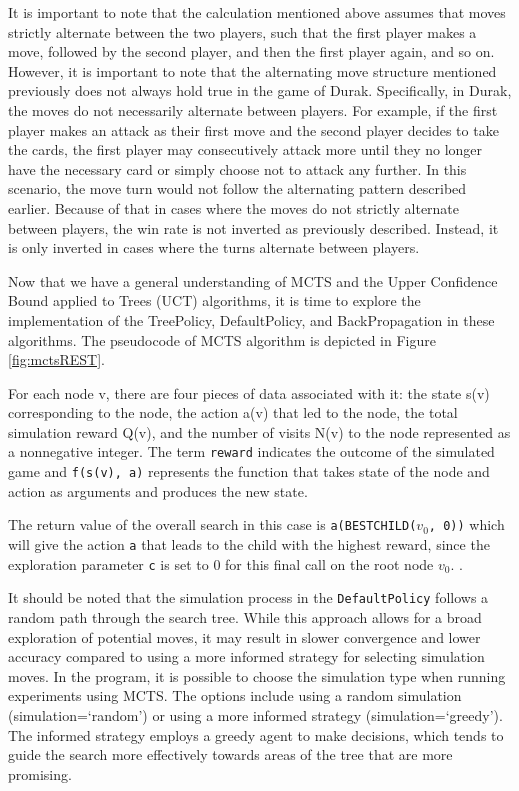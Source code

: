 It is important to note that the calculation mentioned above assumes that moves strictly alternate between the two players, such that the first player makes a move, followed by the second player, and then the first player again, and so on. However, it is important to note that the alternating move structure mentioned previously does not always hold true in the game of Durak. Specifically, in Durak, the moves do not necessarily alternate between players. For example, if the first player makes an attack as their first move and the second player decides to take the cards, the first player may consecutively attack more until they no longer have the necessary card or simply choose not to attack any further. In this scenario, the move turn would not follow the alternating pattern described earlier. Because of that in cases where the moves do not strictly alternate between players, the win rate is not inverted as previously described. Instead, it is only inverted in cases where the turns alternate between players.

Now that we have a general understanding of MCTS and the Upper Confidence Bound applied to Trees (UCT) algorithms, it is time to explore the implementation of the TreePolicy, DefaultPolicy, and BackPropagation in these algorithms. The pseudocode of MCTS algorithm is depicted in Figure  \ref{fig:mctsREST}. 

For each node v, there are four pieces of data associated with it: the state s(v) corresponding to the node, the action a(v) that led to the node, the total simulation reward Q(v), and the number of visits N(v) to the node represented as a nonnegative integer. The term \texttt{reward} indicates the outcome of the simulated game and \texttt{f(s(v), a)} represents the function that takes state of the node and action as arguments and produces the new state. 

The return value of the overall search in this case is \texttt{a(BESTCHILD($v_0$, 0))} which will give the action \texttt{a} that leads to the child with the highest reward, since the exploration parameter \texttt{c} is set to 0 for this final call on the root node $v_0$. \citep{MCTSSurvey}.

It should be noted that the simulation process in the \texttt{DefaultPolicy} follows a random path through the search tree. While this approach allows for a broad exploration of potential moves, it may result in slower convergence and lower accuracy compared to using a more informed strategy for selecting simulation moves. In the program, it is possible to choose the simulation type when running experiments using MCTS. The options include using a random simulation (simulation=`random') or using a more informed strategy (simulation=`greedy'). The informed strategy employs a greedy agent to make decisions, which tends to guide the search more effectively towards areas of the tree that are more promising.


